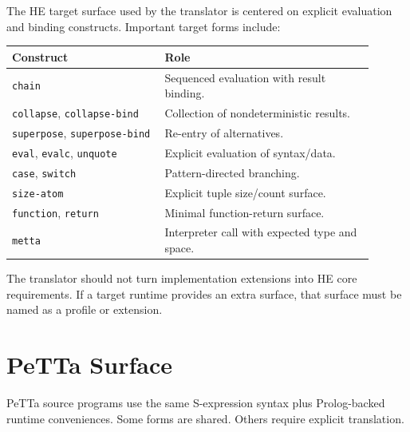 \documentclass[11pt]{article}
\newcommand{\code}[1]{\texttt{#1}}
\newcommand{\HE}{\textup{HE}}
\newcommand{\PeTTa}{\textup{PeTTa}}
\begin{document}
The \HE{} target surface used by the translator is centered on explicit
evaluation and binding constructs.  Important target forms include:
\begin{center}
\begin{tabular}{p{0.38\linewidth}p{0.52\linewidth}}
\toprule
Construct & Role \\
\midrule
\code{chain} & Sequenced evaluation with result binding. \\
\code{collapse}, \code{collapse-bind} & Collection of nondeterministic results. \\
\code{superpose}, \code{superpose-bind} & Re-entry of alternatives. \\
\code{eval}, \code{evalc}, \code{unquote} & Explicit evaluation of syntax/data. \\
\code{case}, \code{switch} & Pattern-directed branching. \\
\code{size-atom} & Explicit tuple size/count surface. \\
\code{function}, \code{return} & Minimal function-return surface. \\
\code{metta} & Interpreter call with expected type and space. \\
\bottomrule
\end{tabular}
\end{center}

The translator should not turn implementation extensions into \HE{} core
requirements.  If a target runtime provides an extra surface, that surface must
be named as a profile or extension.

\section{\PeTTa{} Surface}

\PeTTa{} source programs use the same S-expression syntax plus Prolog-backed
runtime conveniences.  Some forms are shared.  Others require explicit
translation.
\end{document}
